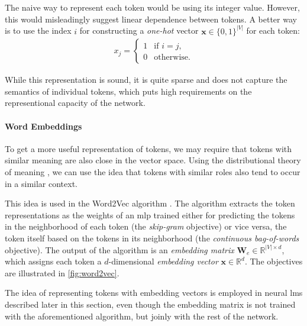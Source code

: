 The naive way to represent each token would be using its integer value. However, this would misleadingly suggest linear dependence between tokens. A better way is to use the index $i$ for constructing a \textit{one-hot} vector $\mathbf{x} \in \{0,1\}^{|V|} $ for each token:
\begin{align}
    x_j = \begin{cases}
        1 & \text{if } i = j, \\
        0 & \text{otherwise}.
    \end{cases}
\end{align}

While this representation is sound, it is quite sparse and does not capture the semantics of individual tokens, which puts high requirements on the representional capacity of the network.

\paragraph{Word Embeddings} To get a more useful representation of tokens, we may require that tokens with similar meaning are also close in the vector space. Using the distributional theory of meaning \cite{harris1954distributional,firth1957synopsis}, we can use the idea that tokens with similar roles also tend to occur in a similar context.

This idea is used in the Word2Vec algorithm \cite{mikolov2013distributed}. The algorithm extracts the token representations as the weights of an \ac{mlp} trained either for predicting the tokens in the neighborhood of each token (the \emph{skip-gram} objective) or vice versa, the token itself based on the tokens in its neighborhood (the \emph{continuous bag-of-words} objective). The output of the algorithm is an \textit{embedding matrix} $\mathbf{W}_e \in \mathbb{R}^{|V|\times d}$, which assigns each token a $d$-dimensional \textit{embedding vector} $\mathbf{x} \in \mathbb{R}^{d}$. The objectives are illustrated in \autoref{fig:word2vec}.

The idea of representing tokens with embedding vectors is employed in neural \acp{lm} described later in this section, even though the embedding matrix is not trained with the aforementioned algorithm, but joinly with the rest of the network.


